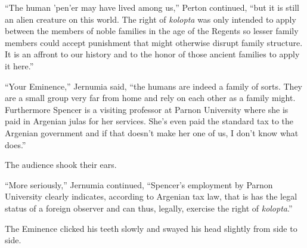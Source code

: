 ``The human 'pen'er may have lived among us,'' Perton continued, ``but it is still an alien
creature on this world. The right of \textit{kolopta} was only intended to apply between the
members of noble families in the age of the Regents so lesser family members could accept
punishment that might otherwise disrupt family structure. It is an affront to our history and to
the honor of those ancient families to apply it here.''

``Your Eminence,'' Jernumia said, ``the humans are indeed a family of sorts. They are a small
group very far from home and rely on each other as a family might. Furthermore Spencer is a
visiting professor at Parnon University where she is paid in Argenian julas for her services.
She's even paid the standard tax to the Argenian government and if that doesn't make her one of
us, I don't know what does.''

The audience shook their ears.

``More seriously,'' Jernumia continued, ``Spencer's employment by Parnon University clearly
indicates, according to Argenian tax law, that is has the legal status of a foreign observer and
can thus, legally, exercise the right of \textit{kolopta}.''

The Eminence clicked his teeth slowly and swayed his head slightly from side to side.
